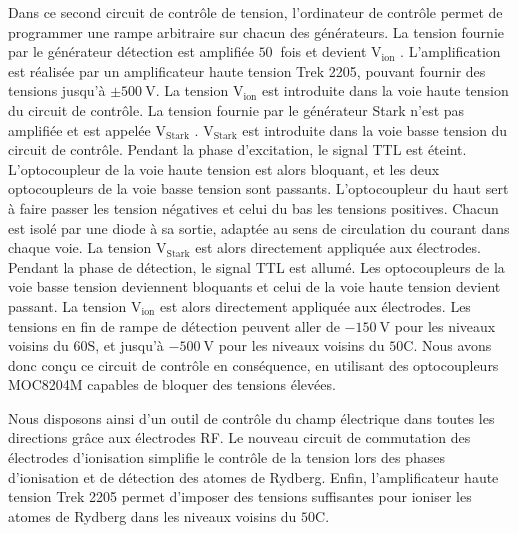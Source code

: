 Dans ce second circuit de contrôle de tension, l'ordinateur de contrôle permet de programmer une rampe arbitraire sur chacun des générateurs.
La tension fournie par le générateur \og détection \fg{} est amplifiée $\SI{50}{}$ fois et devient \og $\mathrm{V_{ion}}$ \fg{}.
L'amplification est réalisée par un amplificateur haute tension Trek 2205, pouvant fournir des tensions jusqu'à $\pm\SI{500}{\V}$.
La tension $\mathrm{V_{ion}}$ est introduite dans la voie haute tension du circuit de contrôle.
La tension fournie par le générateur \og Stark \fg{} n'est pas amplifiée et est appelée \og $\mathrm{V_{Stark}}$ \fg{}.
$\mathrm{V_{Stark}}$ est introduite dans la voie basse tension du circuit de contrôle.
Pendant la phase d'excitation, le signal TTL est éteint. L'optocoupleur de la voie haute tension est alors bloquant, et les deux optocoupleurs de la voie basse tension sont passants.
L'optocoupleur du haut sert à faire passer les tension négatives et celui du bas les tensions positives.
Chacun est isolé par une diode à sa sortie, adaptée au sens de circulation du courant dans chaque voie.
La tension $\mathrm{V_{Stark}}$ est alors directement appliquée aux électrodes.
Pendant la phase de détection, le signal TTL est allumé. Les optocoupleurs de la voie basse tension deviennent bloquants et celui de la voie haute tension devient passant.
La tension $\mathrm{V_{ion}}$ est alors directement appliquée aux électrodes.
Les tensions en fin de rampe de détection peuvent aller de $\SI{-150}{\V}$ pour les niveaux voisins du $\mathrm{60S}$, et jusqu'à $\SI{-500}{\V}$ pour les niveaux voisins du $\mathrm{50C}$.
Nous avons donc conçu ce circuit de contrôle en conséquence, en utilisant des optocoupleurs MOC8204M capables de bloquer des tensions élevées.

Nous disposons ainsi d'un outil de contrôle du champ électrique dans toutes les directions grâce aux électrodes RF.
Le nouveau circuit de commutation des électrodes d'ionisation simplifie le contrôle de la tension lors des phases d'ionisation et de détection des atomes de Rydberg.
Enfin, l'amplificateur haute tension Trek 2205 permet d'imposer des tensions suffisantes pour ioniser les atomes de Rydberg dans les niveaux voisins du $\mathrm{50C}$.


